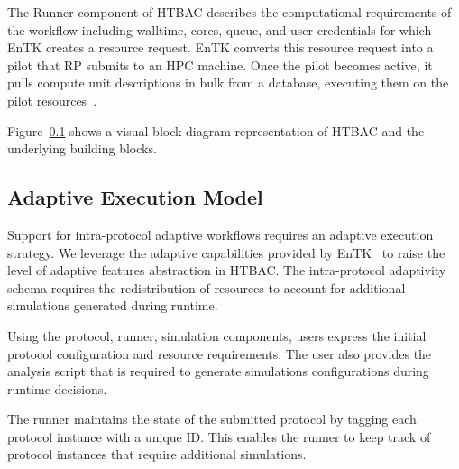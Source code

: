 The Runner component of HTBAC describes the computational requirements of the
workflow including walltime, cores, queue, and user credentials
 for which EnTK creates a resource
request. EnTK converts this resource request into a pilot that RP submits to
an HPC machine. Once the pilot becomes active, it pulls compute unit
descriptions in bulk from a database, executing them on the pilot
resources~\cite{merzky2015radical}.

Figure~\ref{} shows a visual block diagram representation
 of HTBAC and the underlying building
blocks.

\subsection{Adaptive Execution Model}

Support for intra-protocol adaptive workflows requires an adaptive execution 
strategy. We leverage the adaptive capabilities provided by 
EnTK~\cite{adaptivebiomolecular} to raise the level of adaptive features 
abstraction in HTBAC. The intra-protocol adaptivity schema requires the 
redistribution of resources to account for additional simulations generated 
during runtime. 


Using the protocol, runner, simulation components, users express the initial 
protocol configuration and resource requirements. The user also provides the 
analysis script that is required to generate simulations configurations during 
runtime decisions. 


The runner maintains the state of the submitted protocol by tagging each 
protocol instance with a unique ID. This enables the runner to keep track of
protocol instances that require additional simulations. 

